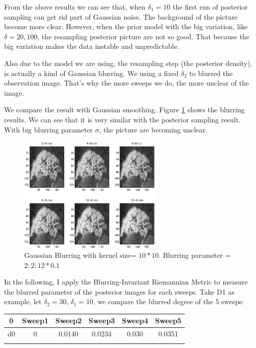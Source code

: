 \documentclass[11pt] {article}
\begin{document}
From the above results we can see that, when $\delta_1=10$ the first run of posterior sampling can get rid part of Gaussian noise. The background of the picture become more clear. However, when the prior model with the big variation, like $\delta=20,100$, the resampling posterior picture are not so good. That because the big variation makes the data instable and unpredictable. 

Also due to the model we are using, the resampling step (the posterior density), is actually a kind of Gaussian blurring. We using a fixed $\delta_2$ to blurred the observation image. That's why the more sweeps we do, the more unclear of the image. 

We compare the result with Gaussian smoothing. Figure \ref{fig:gaussianblure} shows the blurring results. We can see that it is very similar with the posterior sampling result. With big blurring parameter $\sigma$, the picture are becoming unclear. 


\begin{figure}
\begin{center}

\includegraphics[height=2.2in]{figure1.eps}

\end{center}
\caption{Gaussian Blurring with kernel size= $10*10$. Blurring parameter = $2:2:12*0.1$}
\label{fig:gaussianblure}
\end{figure}

In the following, I apply the Blurring-Invariant Riemannian Metric to measure the blurred parameter of the posterior images for each sweeps. Take D1 as example, let $\delta_2=30$, $\delta_1=10$, we compare the blurred degree of the 5 sweeps:
\\

\begin{tabular} { |c | c | c | c | c | c |}

\hline
0 & Sweep1 & Sweep2 & Sweep3 & Sweep4 & Sweep5 \\ \hline
d0 & 0 & 0.0140 & 0.0234 & 0.030 & 0.0351 \\
\hline
\label{table1}
\end{tabular}
\end{document}
